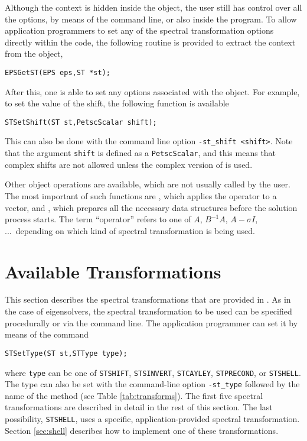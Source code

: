 	Although the  context is hidden inside the  object, the user still has control over all the options, by means of the command line, or also inside the program. To allow application programmers to set any of the spectral transformation options directly within the code, the following routine is provided to extract the  context from the  object,
	\begin{Verbatim}[fontsize=\small]
	EPSGetST(EPS eps,ST *st);
	\end{Verbatim}
	
	After this, one is able to set any options associated with the  object. For example, to set the value of the shift, the following function is available
	\begin{Verbatim}[fontsize=\small]
	STSetShift(ST st,PetscScalar shift);
	\end{Verbatim}
	This can also be done with the command line option \Verb!-st_shift <shift>!. Note that the argument \texttt{shift} is defined as a \texttt{PetscScalar}, and this means that complex shifts are not allowed unless the complex version of \slepc is used.

	Other object operations are available, which are not usually called by the user. The most important of such functions are , which applies the operator to a vector, and , which prepares all the necessary data structures before the solution process starts. The term ``operator'' refers to one of $A$, $B^{-1}\!A$, $A-\sigma I$, ...\ depending on which kind of spectral transformation is being used.
 
\section{Available Transformations}

	This section describes the spectral transformations that are provided in \slepc. As in the case of eigensolvers, the spectral transformation to be used can be specified procedurally or via the command line. The application programmer can set it by means of the command
	\begin{Verbatim}[fontsize=\small]
	STSetType(ST st,STType type);
	\end{Verbatim}
where \texttt{type} can be one of 
\texttt{STSHIFT}, 
\texttt{STSINVERT}, \texttt{STCAYLEY},
\texttt{STPRECOND}, or \texttt{STSHELL}.
The  type can also be set with the command-line option \Verb!-st_type! followed by the name of the method (see Table \ref{tab:transforms}). The first five spectral transformations are described in detail in the rest of this section. The last possibility, \texttt{STSHELL}, uses a specific, application-provided spectral transformation. Section \ref{sec:shell} describes how to implement one of these transformations.


